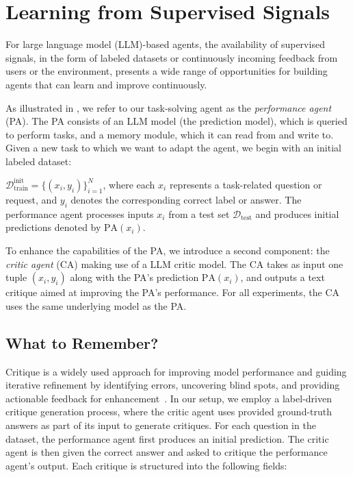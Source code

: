 

\section{Learning from Supervised Signals}
For large language model (LLM)-based agents, the availability of supervised signals, in the form of labeled datasets or continuously incoming feedback from users or the environment, presents a wide range of opportunities for building agents that can learn and improve continuously.

As illustrated in , we refer to our task-solving agent as the \textit{performance agent} (PA). The PA consists of an LLM model (the prediction model), which is queried to perform tasks, and a memory module, which it can read from and write to. Given a new task to which we want to adapt the agent, we begin with an initial labeled dataset:

$\mathcal{D}_{\text{train}}^{\text{init}} = \{(x_i, y_i)\}_{i=1}^{N}$,
where each \(x_i\) represents a task-related question or request, and \(y_i\) denotes the corresponding correct label or answer. The performance agent processes inputs \(x_i\) from a test set \(\mathcal{D}_{\text{test}}\) and produces initial predictions denoted by \(\text{PA}(x_i)\).

To enhance the capabilities of the PA, we introduce a second component: the \textit{critic agent} (CA) making use of a LLM critic model. The CA takes as input one tuple \((x_i, y_i)\) along with the PA's prediction \(\text{PA}(x_i)\), and outputs a text critique aimed at improving the PA's performance. For all experiments, the CA uses the same underlying model as the PA.


\subsection{What to Remember?}

Critique is a widely used approach for improving model performance and guiding iterative refinement by identifying errors, uncovering blind spots, and providing actionable feedback for enhancement~\cite{NEURIPS2023_1b44b878,gou2024critic,chen2024teaching, burleigh-etal-2025-beyond}.
In our setup, we employ a label-driven critique generation process, where the critic agent uses provided ground-truth answers as part of its input to generate critiques. For each question in the dataset, the performance agent first produces an initial prediction. The critic agent is then given the correct answer and asked to critique the performance agent’s output. Each critique is structured into the following fields:

